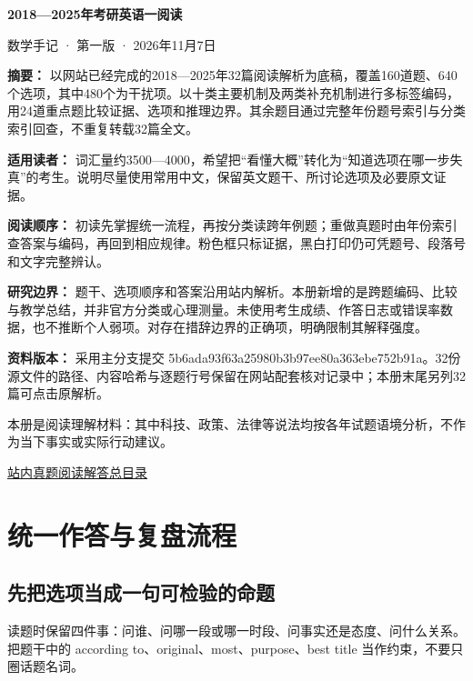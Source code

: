 \documentclass[11pt,a4paper]{article}
\begin{document}
\begin{center}
{\LARGE\bfseries 2018—2025年考研英语一阅读\par}
\vspace{5pt}{\LARGE\bfseries 干扰项规律与解题方法\par}
\vspace{10pt}{\large 跨年份证据比较与长期复习专册\par}
\vspace{8pt}数学手记 · 第一版 · 2026年11月7日
\end{center}

\noindent\textbf{摘要：} 以网站已经完成的2018—2025年32篇阅读解析为底稿，覆盖160道题、640个选项，其中480个为干扰项。以十类主要机制及两类补充机制进行多标签编码，用24道重点题比较证据、选项和推理边界。其余题目通过完整年份题号索引与分类索引回查，不重复转载32篇全文。\par\smallskip
\noindent\textbf{适用读者：} 词汇量约3500—4000，希望把“看懂大概”转化为“知道选项在哪一步失真”的考生。说明尽量使用常用中文，保留英文题干、所讨论选项及必要原文证据。\par\smallskip
\noindent\textbf{阅读顺序：} 初读先掌握统一流程，再按分类读跨年例题；重做真题时由年份索引查答案与编码，再回到相应规律。粉色框只标证据，黑白打印仍可凭题号、段落号和文字完整辨认。\par\smallskip
\noindent\textbf{研究边界：} 题干、选项顺序和答案沿用站内解析。本册新增的是跨题编码、比较与教学总结，并非官方分类或心理测量。未使用考生成绩、作答日志或错误率数据，也不推断个人弱项。对存在措辞边界的正确项，明确限制其解释强度。\par\smallskip
\noindent\textbf{资料版本：} 采用主分支提交 5b6ada93f63a25980b3b97ee80a363ebe752b91a。32份源文件的路径、内容哈希与逐题行号保留在网站配套核对记录中；本册末尾另列32篇可点击原解析。\par\smallskip
本册是阅读理解材料：其中科技、政策、法律等说法均按各年试题语境分析，不作为当下事实或实际行动建议。

\noindent \href{https://zj139.github.io/math-notes/english/reading-answers/}{站内真题阅读解答总目录}
\clearpage\section{统一作答与复盘流程}\label{methods}
\subsection{先把选项当成一句可检验的命题}
读题时保留四件事：问谁、问哪一段或哪一时段、问事实还是态度、问什么关系。把题干中的 according to、original、most、purpose、best title 当作约束，不要只圈话题名词。
\end{document}
